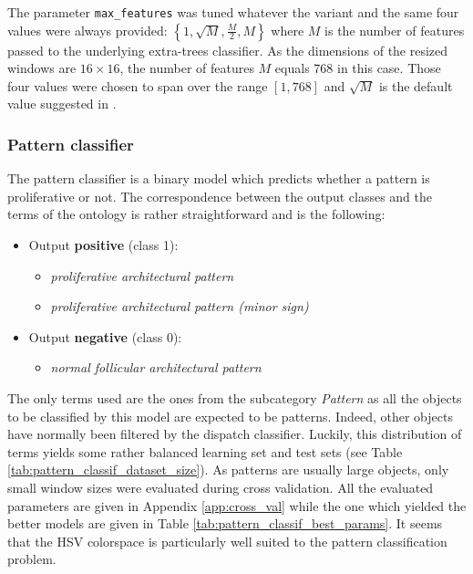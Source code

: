 The parameter \texttt{max\_features} was tuned whatever the variant and the same four values were always provided: $\left\{1, \sqrt{M}, \frac{M}{2}, M\right\}$ where $M$ is the number of features passed to the underlying extra-trees classifier. As the dimensions of the resized windows are $16\times 16$, the number of features $M$ equals 768 in this case. Those four values were chosen to span over the range $[1, 768]$ and $\sqrt{M}$ is the default value suggested in \cite{Geurts2006}. 

\subsubsection{Pattern classifier}
\label{sssec:thyroid_pattern_model}
The pattern classifier is a binary model which predicts whether a pattern is proliferative or not. The correspondence between the output classes and the terms of the ontology is rather straightforward and is the following:

\begin{itemize}
	\item Output \textbf{positive} (class 1): 
	\begin{itemize}
		\item \textit{proliferative architectural pattern}
		\item \textit{proliferative architectural pattern (minor sign)}
	\end{itemize}
	\item Output \textbf{negative} (class 0): 
	\begin{itemize}
		\item \textit{normal follicular architectural pattern}
	\end{itemize}		
\end{itemize}

The only terms used are the ones from the subcategory \textit{Pattern} as all the objects to be classified by this model are expected to be patterns.  Indeed, other objects have normally been filtered by the dispatch classifier. Luckily, this distribution of terms yields some rather balanced learning set and test sets (see Table \ref{tab:pattern_classif_dataset_size}). As patterns are usually large objects, only small window sizes were evaluated during cross validation. All the evaluated parameters are given in Appendix \ref{app:cross_val} while the one which yielded the better models are given in Table \ref{tab:pattern_classif_best_params}. It seems that the HSV colorspace is particularly well suited to the pattern classification problem. 

